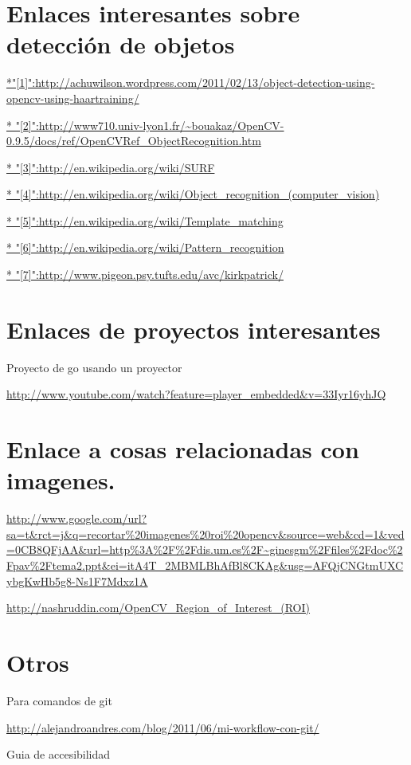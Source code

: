 \documentclass[12pt,a4paper]{report}
\begin{document}
\section{Enlaces interesantes sobre detección de objetos}

\url{*"[1]":http://achuwilson.wordpress.com/2011/02/13/object-detection-using-opencv-using-haartraining/}

\url{* "[2]":http://www710.univ-lyon1.fr/~bouakaz/OpenCV-0.9.5/docs/ref/OpenCVRef_ObjectRecognition.htm}

\url{* "[3]":http://en.wikipedia.org/wiki/SURF}

\url{* "[4]":http://en.wikipedia.org/wiki/Object_recognition_(computer_vision)}

\url{* "[5]":http://en.wikipedia.org/wiki/Template_matching}

\url{* "[6]":http://en.wikipedia.org/wiki/Pattern_recognition}

\url{* "[7]":http://www.pigeon.psy.tufts.edu/avc/kirkpatrick/}

\section{Enlaces de proyectos interesantes}

Proyecto de go usando un proyector

\url{http://www.youtube.com/watch?feature=player_embedded&v=33Iyr16yhJQ}


\section{Enlace a cosas relacionadas con imagenes.} 

\url{http://www.google.com/url?sa=t&rct=j&q=recortar%20imagenes%20roi%20opencv&source=web&cd=1&ved=0CB8QFjAA&url=http%3A%2F%2Fdis.um.es%2F~ginesgm%2Ffiles%2Fdoc%2Fpav%2Ftema2.ppt&ei=itA4T_2MBMLBhAfBl8CKAg&usg=AFQjCNGtmUXCybgKwHb5g8-Ns1F7Mdxz1A}

\url{http://nashruddin.com/OpenCV_Region_of_Interest_(ROI)}

\section{Otros}

Para comandos de git

\url{http://alejandroandres.com/blog/2011/06/mi-workflow-con-git/}

Guia de accesibilidad 
\end{document}
